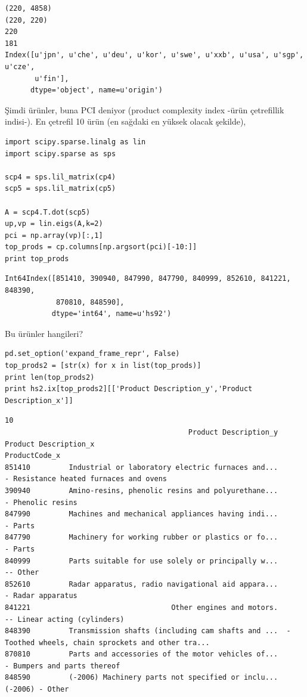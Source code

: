 \documentclass[12pt,fleqn]{article}\usepackage{../../common}
\begin{document}
\begin{verbatim}
(220, 4858)
(220, 220)
220
181
Index([u'jpn', u'che', u'deu', u'kor', u'swe', u'xxb', u'usa', u'sgp', u'cze',
       u'fin'],
      dtype='object', name=u'origin')
\end{verbatim}

Şimdi ürünler, buna PCI deniyor (product complexity index -ürün çetrefillik
indisi-). En çetrefil 10 ürün (en sağdaki en yüksek olacak şekilde),

\begin{verbatim}
import scipy.sparse.linalg as lin
import scipy.sparse as sps

scp4 = sps.lil_matrix(cp4)
scp5 = sps.lil_matrix(cp5)

A = scp4.T.dot(scp5)
up,vp = lin.eigs(A,k=2)
pci = np.array(vp)[:,1]
top_prods = cp.columns[np.argsort(pci)[-10:]]
print top_prods
\end{verbatim}

\begin{verbatim}
Int64Index([851410, 390940, 847990, 847790, 840999, 852610, 841221, 848390,
            870810, 848590],
           dtype='int64', name=u'hs92')
\end{verbatim}

Bu ürünler hangileri?

\begin{verbatim}
pd.set_option('expand_frame_repr', False)
top_prods2 = [str(x) for x in list(top_prods)]
print len(top_prods2)
print hs2.ix[top_prods2][['Product Description_y','Product Description_x']]
\end{verbatim}

\begin{verbatim}
10
                                           Product Description_y                              Product Description_x
ProductCode_x                                                                                                      
851410         Industrial or laboratory electric furnaces and...             - Resistance heated furnaces and ovens
390940         Amino-resins, phenolic resins and polyurethane...                                  - Phenolic resins
847990         Machines and mechanical appliances having indi...                                            - Parts
847790         Machinery for working rubber or plastics or fo...                                            - Parts
840999         Parts suitable for use solely or principally w...                                           -- Other
852610         Radar apparatus, radio navigational aid appara...                                  - Radar apparatus
841221                                 Other engines and motors.                       -- Linear acting (cylinders)
848390         Transmission shafts (including cam shafts and ...  -Toothed wheels, chain sprockets and other tra...
870810         Parts and accessories of the motor vehicles of...                        - Bumpers and parts thereof
848590         (-2006) Machinery parts not specified or inclu...                                    (-2006) - Other
\end{verbatim}
\end{document}
